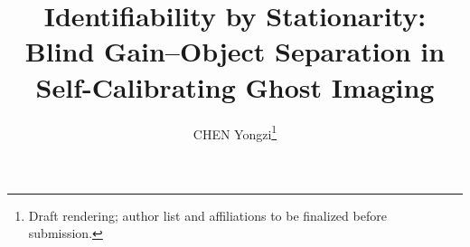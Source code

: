 \documentclass[journal,twoside]{IEEEtran}
\begin{document}
\title{Identifiability by Stationarity: Blind Gain--Object Separation in Self-Calibrating Ghost Imaging}

\author{%
CHEN Yongzi\thanks{Draft rendering; author list and affiliations to be finalized before submission.}%
}


\maketitle






\end{document}
